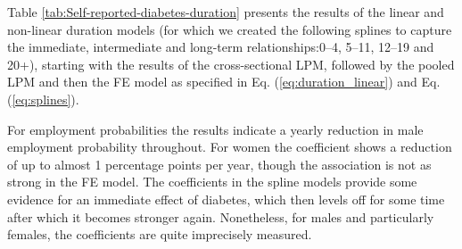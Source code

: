 Table \ref{tab:Self-reported-diabetes-duration} presents the results of the linear and non-linear duration models (for which we created the following splines to capture the immediate, intermediate and long-term relationships:0--4,
5--11, 12--19 and 20+), starting with the results of the cross-sectional \ac{LPM}, followed by the pooled \ac{LPM} and then the \ac{FE} model as specified in Eq. (\ref{eq:duration_linear}) and Eq. (\ref{eq:splines}).

For employment probabilities the results indicate a yearly reduction in male employment probability throughout. For women the coefficient shows a reduction of up to almost 1 percentage points per year, though the association is not as strong in the \ac{FE} model. The coefficients in the spline models provide some evidence for an immediate effect of diabetes, which then levels off for some time after which it becomes stronger again. Nonetheless, for males and particularly females, the coefficients are quite imprecisely measured.

